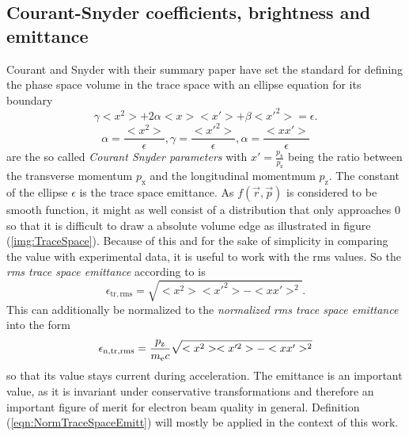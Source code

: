 \subsection{Courant-Snyder coefficients, brightness and emittance}
Courant and Snyder with their summary paper \cite{COURANT1958} have set the standard for defining the phase space volume in the trace space with an ellipse equation for its boundary
\begin{equation}
\label{eqn:CourandSnyderEllipse}
\gamma <x^2>+2\alpha <x> <x'>+\beta <x'^2> =\epsilon.
\end{equation}
\begin{equation}
\alpha =\frac{<x^2>}{\epsilon}, \gamma=\frac{<x'^2>}{\epsilon}, \alpha=\frac{<xx'>}{\epsilon}
\end{equation}
are the so called \textit{Courant Snyder parameters} with $x'=\frac{p_\mathrm{x}}{p_\mathrm{z}}$ being the ratio between the transverse momentum $p_\mathrm{x}$ and the longitudinal momentmum $p_\mathrm{z}$.
The constant of the ellipse $\epsilon$ is the trace space emittance. 
As $f(\vec{r},\vec{p})$ is considered to be smooth function, it might as well consist of a distribution that only approaches 0 so that it is difficult to draw a absolute volume edge as illustrated in figure (\ref{img:TraceSpace}).
Because of this and for the sake of simplicity in comparing the value with experimental data, it is useful to work with the rms values. So the \textit{rms trace space emittance} according to \cite{PRSTAB_Emittance_Floettmann} is
\begin{equation}
\epsilon_\mathrm{tr,rms}=\sqrt{<x^2><x'^2>-<xx'>^2}.
\end{equation}
This can additionally be normalized to the \textit{normalized rms trace space emittance} into the form
\begin{equation}
\label{eqn:NormTraceSpaceEmitt}
\epsilon_\mathrm{n,tr,rms}=\frac{p_\mathrm{z}}{m_\mathrm{e} c}\sqrt{<x^2><x'^2>-<xx'>^2}
\end{equation} 
so that its value stays current during acceleration.
The emittance is an important value, as it is invariant under conservative transformations and therefore an important 
figure of merit for electron beam quality in general. 
Definition (\ref{eqn:NormTraceSpaceEmitt}) will mostly be applied in the context of this work.

